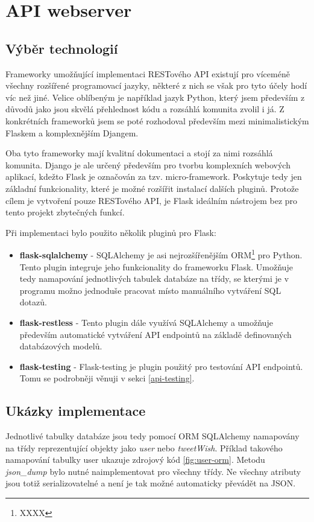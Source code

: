 \documentclass[thesis=B,czech]{FITthesis}[2012/06/26]
\begin{document}
\section{API webserver}
\subsection{Výběr technologií}
	Frameworky umožňující implementaci RESTového API existují pro víceméně všechny rozšířené programovací jazyky, některé z nich se však pro tyto účely hodí víc než jiné. Velice oblíbeným je například jazyk Python, který jsem především z důvodů jako jsou skvělá přehlednost kódu a rozsáhlá komunita zvolil i já. Z konkrétních frameworků jsem se poté rozhodoval především mezi minimalistickým Flaskem a komplexnějším Djangem. 
	
	Oba tyto frameworky mají kvalitní dokumentaci a stojí za nimi rozsáhlá komunita. Django je ale určený především pro tvorbu komplexních webových aplikací, kdežto Flask je označován za tzv. micro-framework. Poskytuje tedy jen základní funkcionality, které je možné rozšířit instalací dalších pluginů. Protože cílem je vytvoření pouze RESTového API, je Flask ideálním nástrojem bez pro tento projekt zbytečných funkcí. 
	
\noindent Při implementaci bylo použito několik pluginů pro Flask:
	
\begin{itemize}
\item \textbf{flask-sqlalchemy} - SQLAlchemy je asi nejrozšířenějším ORM\footnote{XXXX} pro Python. Tento plugin integruje jeho funkcionality do frameworku Flask. Umožňuje tedy namapování jednotlivých tabulek databáze na třídy, se kterými je v programu možno jednoduše pracovat místo manuálního vytváření SQL dotazů. 
\item \textbf{flask-restless} - Tento plugin dále využívá SQLAlchemy a umožňuje především automatické vytváření API endpointů na základě definovaných databázových modelů. 
\item \textbf{flask-testing} - Flask-testing je plugin použitý pro testování API endpointů. Tomu se podrobněji věnuji v sekci \ref{api-testing}.
\end{itemize}

\subsection{Ukázky implementace}
Jednotlivé tabulky databáze jsou tedy pomocí ORM SQLAlchemy namapovány na třídy reprezentující objekty jako \textit{user} nebo \textit{tweetWish}. Příklad takového namapování tabulky user ukazuje zdrojový kód \ref{fig:user-orm}. Metodu \textit{json\_dump} bylo nutné naimplementovat pro všechny třídy. Ne všechny atributy jsou totiž serializovatelné a není je tak možné automaticky převádět na JSON. 
\end{document}
